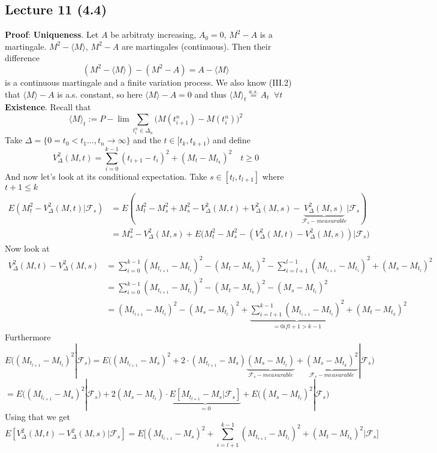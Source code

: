 \documentclass[english]{article}
\newcommand{\ub}{\underbrace}
\newcommand{\note}[1]{\noindent\textbf{#1}}
\newcommand{\F}{\mathcal F}
\newcommand{\as}[1]{\stackrel {a.s.}{#1}}
\begin{document}
\subsection*{Lecture 11 (4.4)}
\note{Proof}: \textbf{Uniqueness}. Let $A$ be arbitraty increasing, $A_0 =0$, $M^2-A$ is a martingale. $M^2- \langle M \rangle$, $M^2-A$ are martingales (continuous). Then their difference
$$(M^2 - \langle M \rangle) - (M^2 - A) = A-\langle M \rangle$$
is a continuous martingale and a finite variation process. We also know (III.2) that $\langle M \rangle - A$ is a.s. constant, so here $\langle M \rangle - A = 0$ and thus $\langle M\rangle_t \as= A_t\;\; \forall t$  \newline
\textbf{Existence}. Recall that 
$$\langle M \rangle_t := P-\lim \sum_{t^n_i \in \Delta_n} \Big( M(t^n_{i+1}) - M(t^n_i) \Big)^2$$
Take $\Delta = \{0=t_0  <t_1 \dots, t_n \to \infty\}$ and the $t\in [t_k, t_{k+1})$ and define
$$V^2_\Delta (M,t) = \sum_{i=0}^{k-1} (t_{i+1} - t_i)^2 + (M_t - M_{t_k})^2 \quad t\geq 0$$
And now let's look at its conditional expectation. Take $s \in [t_l, t_{l+1}]$ where $t+1 \leq k$
\begin{align*}
E(M^2_t - V^2_\Delta(M,t)|\F_s) &= E(M^2_t - M^2_s + M^2_s - V^2_\Delta(M,t) + V^2_\Delta(M, s) - \ub{V^2_\Delta(M,s)} _{\F_s-measurable} |\F_s) \\
&= M^2_s - V^2_\Delta(M,s) + E\big(M^2_t - M^2_s - (V^2_\Delta(M,t) - V^2_\Delta(M,s)) \big| \F_s\big)
\end{align*}
Now look at
\begin{align*} V^2_\Delta(M,t) - V^2_\Delta(M,s) & = \sum^{k-1}_{i=0} (M_{t_{i+1}} - M_{t_i})^2 - (M_t - M_{t_k})^2 - \sum^{l-1}_{i=l+1} (M_{t_{i+1}} - M_{t_i})^2 + (M_s - M_{t_l})^2 \\
& = \sum^{k-1}_{i=0} (M_{t_{i+1}} - M_{t_i})^2 - (M_t - M_{t_k})^2 - (M_s - M_{t_l})^2 \\
&= (M_{t_{l+1}} - M_{t_l})^2 - (M_s - M_{t_l})^2 + \ub{\sum^{k-1}_{i=l+1} (M_{t_{i+1}} - M_{t_i})^2}_{=0 if l+1 > k-1} + (M_t - M_{t_k})^2
\end{align*}
Furthermore
$$E\big( (M_{t_{l+1}} - M_{t_l})^2 | \F_s \big) = E\big((M_{t_{l+1}} - M_s)^2 + 2\cdot (M_{t_{l+1}} - M_s)\ub{(M_s - M_{t_l})}_{\F_s -measurable} + \ub{(M_s - M_{t_k})^2}_{\F_s-measurable} | \F_s \big)$$
$$= E\big( (M_{t_{l+1}} - M_s)^2| \F_s \big) + 2(M_s - M_{t_l}) \cdot \ub{E [ M_{t_{l+1}} - M_s | \F_s]}_{=0} + E\big((M_s - M_{t_l})^2 | \F_s\big) $$
Using that we get
$$E[V^2_\Delta(M,t) - V^2_\Delta (M,s) | \F_s ] = E\Big[ (M_{t_{l+1}} - M_s)^2 + \sum^{k-1}_{i=l+1} (M_{t_{i+1}} - M_{t_i})^2 + (M_t - M_{t_k})^2 \Big| \F_s\Big]$$
\end{document}
